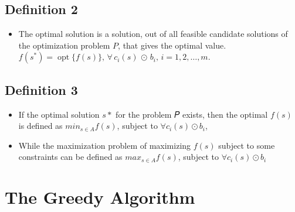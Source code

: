 \documentclass[
  letterpaper,
  DIV=11,
  numbers=noendperiod]{scrreprt}
\providecommand{\tightlist}{%
  \setlength{\itemsep}{0pt}\setlength{\parskip}{0pt}}\usepackage{longtable,booktabs,array}
\begin{document}
\section{Definition 2}\label{definition-2}

\begin{itemize}
\tightlist
\item
  The optimal solution is a solution, out of all feasible candidate
  solutions of the optimization problem \(P\), that gives the optimal
  value.
  \(f(s^*) = \operatorname{opt} \{f(s)\}, \, \forall \, c_i(s) \, \odot \, b_i, \, i = 1, 2, \dots, m.\)
\end{itemize}

\section{Definition 3}\label{definition-3}

\begin{itemize}
\tightlist
\item
  If the optimal solution \(s*\) for the problem 𝑃 exists, then the
  optimal \(f(s)\) is defined as \(min_{s \in A} f(s)\), subject to
  \(\forall c_i(s) \odot b_i\),
\item
  While the maximization problem of maximizing \(f(s)\) subject to some
  constraints can be defined as \(max_{s \in A} f(s)\), subject to
  \(\forall c_i(s) \odot b_i\)
\end{itemize}


\chapter{The Greedy Algorithm}\label{the-greedy-algorithm}
\end{document}
